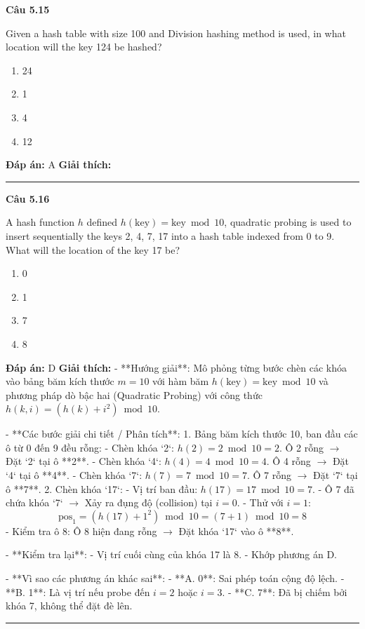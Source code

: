 \documentclass[11pt,a4paper]{article}
\newenvironment{question}[1]{%
  \par\vspace{1em}\noindent\textbf{\large Câu #1}\par\vspace{0.4em}
}{%
  \par\vspace{1em}\hrule\vspace{0.6em}
}
\newenvironment{choices}{%
  \begin{enumerate}[label=\textbf{\Alph*.},leftmargin=2.2em,itemsep=2pt,topsep=3pt]
}{%
  \end{enumerate}
}
\newcommand{\choice}{\item}
\begin{document}
\begin{question}{5.15}
Given a hash table with size 100 and Division hashing method is used, in what location will the key 124 be hashed?
\begin{choices}
\choice 24
\choice 1
\choice 4
\choice 12
\end{choices}
\textbf{Đáp án:} A
\textbf{Giải thích:} 
\end{question}

\begin{question}{5.16}
A hash function \(h\) defined \(h(\text{key}) = \text{key} \bmod 10\), quadratic probing is used to insert sequentially the keys 2, 4, 7, 17 into a hash table indexed from 0 to 9. What will the location of the key 17 be?
\begin{choices}
\choice 0
\choice 1
\choice 7
\choice 8
\end{choices}
\textbf{Đáp án:} D
\textbf{Giải thích:} - **Hướng giải**:
  Mô phỏng từng bước chèn các khóa vào bảng băm kích thước \(m = 10\) với hàm băm \(h(\text{key}) = \text{key} \bmod 10\) và phương pháp dò bậc hai (Quadratic Probing) với công thức \(h(k, i) = (h(k) + i^2) \bmod 10\).

- **Các bước giải chi tiết / Phân tích**:
  1. Bảng băm kích thước 10, ban đầu các ô từ 0 đến 9 đều rỗng:
     - Chèn khóa `2`: \(h(2) = 2 \bmod 10 = 2\). Ô 2 rỗng \(\rightarrow\) Đặt `2` tại ô **2**.
     - Chèn khóa `4`: \(h(4) = 4 \bmod 10 = 4\). Ô 4 rỗng \(\rightarrow\) Đặt `4` tại ô **4**.
     - Chèn khóa `7`: \(h(7) = 7 \bmod 10 = 7\). Ô 7 rỗng \(\rightarrow\) Đặt `7` tại ô **7**.
  2. Chèn khóa `17`:
     - Vị trí ban đầu: \(h(17) = 17 \bmod 10 = 7\).
     - Ô 7 đã chứa khóa `7` \(\rightarrow\) Xảy ra đụng độ (collision) tại \(i = 0\).
     - Thử với \(i = 1\):
       \[
       \text{pos}_1 = (h(17) + 1^2) \bmod 10 = (7 + 1) \bmod 10 = 8
       \]
     - Kiểm tra ô 8: Ô 8 hiện đang rỗng \(\rightarrow\) Đặt khóa `17` vào ô **8**.

- **Kiểm tra lại**:
  - Vị trí cuối cùng của khóa 17 là 8.
  - Khớp phương án D.

- **Vì sao các phương án khác sai**:
  - **A. 0**: Sai phép toán cộng độ lệch.
  - **B. 1**: Là vị trí nếu probe đến \(i=2\) hoặc \(i=3\).
  - **C. 7**: Đã bị chiếm bởi khóa 7, không thể đặt đè lên.
\end{question}
\end{document}
